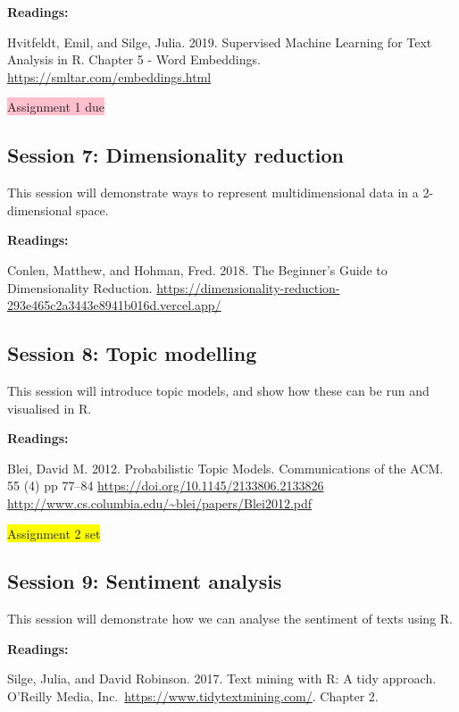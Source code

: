 \documentclass[
]{article}
\begin{document}
\textbf{Readings:}

Hvitfeldt, Emil, and Silge, Julia. 2019. Supervised Machine Learning for
Text Analysis in R. Chapter 5 - Word Embeddings.
\url{https://smltar.com/embeddings.html}

\colorbox{pink}{Assignment 1 due}

\hypertarget{session-7-dimensionality-reduction}{%
\subsection{Session 7: Dimensionality
reduction}\label{session-7-dimensionality-reduction}}

This session will demonstrate ways to represent multidimensional data in
a 2-dimensional space.

\textbf{Readings:}

Conlen, Matthew, and Hohman, Fred. 2018. The Beginner's Guide to
Dimensionality Reduction.
\url{https://dimensionality-reduction-293e465c2a3443e8941b016d.vercel.app/}

\hypertarget{session-8-topic-modelling}{%
\subsection{Session 8: Topic
modelling}\label{session-8-topic-modelling}}

This session will introduce topic models, and show how these can be run
and visualised in R.

\textbf{Readings:}

Blei, David M. 2012. Probabilistic Topic Models. Communications of the
ACM. 55 (4) pp 77--84 \url{https://doi.org/10.1145/2133806.2133826}
\url{http://www.cs.columbia.edu/~blei/papers/Blei2012.pdf}

\colorbox{yellow}{Assignment 2 set}

\hypertarget{session-9-sentiment-analysis}{%
\subsection{Session 9: Sentiment
analysis}\label{session-9-sentiment-analysis}}

This session will demonstrate how we can analyse the sentiment of texts
using R.

\textbf{Readings:}

Silge, Julia, and David Robinson. 2017. Text mining with R: A tidy
approach. O'Reilly Media, Inc.~\url{https://www.tidytextmining.com/}.
Chapter 2.
\end{document}
